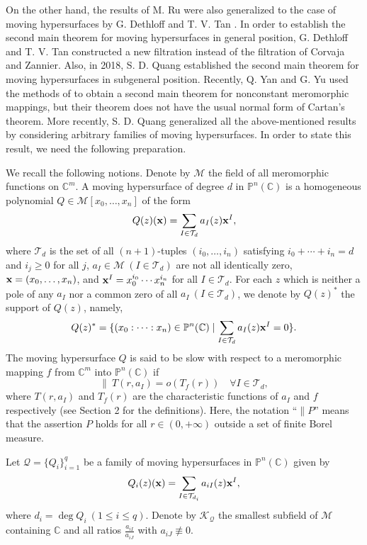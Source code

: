 \documentclass[12pt,leqno]{amsart}
\newcommand{\C}{{\mathbb{C}}}
\renewcommand{\P}{{\mathbb{P}}}
\numberwithin{equation}{section}
\begin{document}
On the other hand, the results of M. Ru were also generalized to the case of moving hypersurfaces by G. Dethloff and T. V. Tan \cite{DT1,DT2}. In order to establish the second main theorem for moving hypersurfaces in general position, G. Dethloff and T. V. Tan constructed a new filtration instead of the filtration of Corvaja and Zannier. Also, in 2018, S. D. Quang \cite{Q18} established the second main theorem for moving hypersurfaces in subgeneral position. Recently, Q. Yan and G. Yu \cite{YY} used the methods of \cite{DT2,Q18,Q19} to obtain a second main theorem for nonconstant meromorphic mappings, but their theorem does not have the usual normal form of Cartan's theorem. More recently, S. D. Quang \cite{Q22c} generalized all the above-mentioned results by considering arbitrary families of moving hypersurfaces. In order to state this result, we need the following preparation.

We recall the following notions. Denote by $\mathcal M$ the field of all meromorphic functions on $\C^m$. A moving hypersurface of degree $d$ in $\P^n(\C)$ is a homogeneous polynomial $Q\in\mathcal M[x_0,\ldots,x_n]$ of the form
$$
Q(z)({\bf x})=\sum_{I\in\mathcal T_{d}}a_{I}(z){\bf x}^I,
$$
where $\mathcal T_d$ is the set of all $(n+1)$-tuples $(i_0,\ldots,i_n)$ satisfying $i_0+\cdots+i_n=d$ and $i_j\ge 0$ for all $j$, $a_{I}\in\mathcal M\ (I\in\mathcal T_{d})$ are not all identically zero, ${\bf x}=(x_0,\ldots,x_n)$, and ${\bf x}^I=x_0^{i_0}\cdots x_n^{i_n}$ for all $I\in\mathcal T_d$.
For each $z$ which is neither a pole of any $a_{I}$ nor a common zero of all $a_{I}\ (I\in\mathcal T_{d})$, we denote by $Q(z)^*$ the support of $Q(z)$, namely,
$$
Q(z)^*=\{(x_0:\cdots:x_n)\in\P^n(\C)\mid \sum_{I\in\mathcal T_{d}}a_{I}(z){\bf x}^I=0\}.
$$
The moving hypersurface $Q$ is said to be slow with respect to a meromorphic mapping $f$ from $\C^m$ into $\P^n(\C)$ if
$$
\| \ T(r,a_I)=o(T_f(r))\quad \forall I\in\mathcal T_d,
$$
where $T(r,a_I)$ and $T_f(r)$ are the characteristic functions of $a_I$ and $f$ respectively (see Section 2 for the definitions).
Here, the notation ``$\| P$'' means that the assertion $P$ holds for all $r\in(0,+\infty)$ outside a set of finite Borel measure.

Let $\mathcal Q=\{Q_i\}_{i=1}^q$ be a family of moving hypersurfaces in $\P^n(\C)$ given by
$$
Q_i(z)({\bf x})=\sum_{I\in\mathcal T_{d_i}}a_{iI}(z){\bf x}^I,
$$
where $d_i=\deg Q_i\ (1\le i\le q)$. Denote by ${\mathcal K}_{\mathcal Q}$ the smallest subfield of $\mathcal M$ containing $\C$ and all ratios $\frac{a_{iI}}{a_{iJ}}$ with $a_{iJ}\not\equiv 0$.
\end{document}
